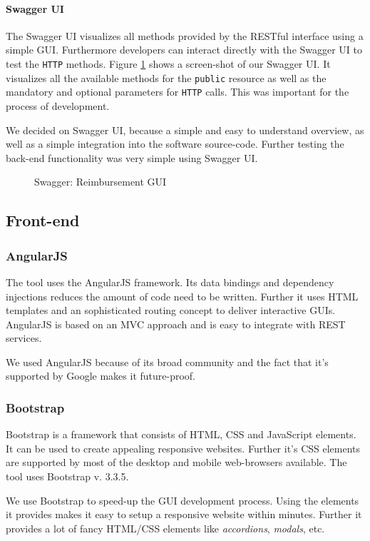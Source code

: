 \paragraph{Swagger UI}
The Swagger UI visualizes all methods provided by the RESTful interface using a simple GUI. Furthermore developers can interact directly with the Swagger UI to test the \texttt{HTTP} methods. Figure \ref{fig:swagger01} shows a screen-shot of our Swagger UI. It visualizes all the available methods for the \texttt{public} resource as well as the mandatory and optional parameters for \texttt{HTTP} calls. This was important for the process of development. \cite{swagger} \par
We decided on Swagger UI, because a simple and easy to understand overview, as well as a simple integration into the software source-code. Further testing the back-end functionality was very simple using Swagger UI.

\begin{figure}[H]
	\centering
	\caption{Swagger: Reimbursement GUI}
	\label{fig:swagger01}
\end{figure}

\subsection{Front-end}

\subsubsection{AngularJS}
The tool uses the AngularJS framework. Its data bindings and dependency injections reduces the amount of code need to be written. Further it uses HTML templates and an sophisticated routing concept to deliver interactive GUIs. AngularJS is based on an MVC approach and is easy to integrate with REST services.\cite{angular}\par
We used AngularJS because of its broad community and the fact that it's supported by Google makes it future-proof.

\subsubsection{Bootstrap}
Bootstrap is a framework that consists of HTML, CSS and JavaScript elements. It can be used to create appealing responsive websites. Further it's CSS elements are supported by most of the desktop and mobile web-browsers available. The tool uses Bootstrap v. 3.3.5. \cite{bootstrap}\par
We use Bootstrap to speed-up the GUI development process. Using the elements it provides makes it easy to setup a responsive website within minutes. Further it provides a lot of fancy HTML/CSS elements like \textit{accordions}, \textit{modals}, etc.

